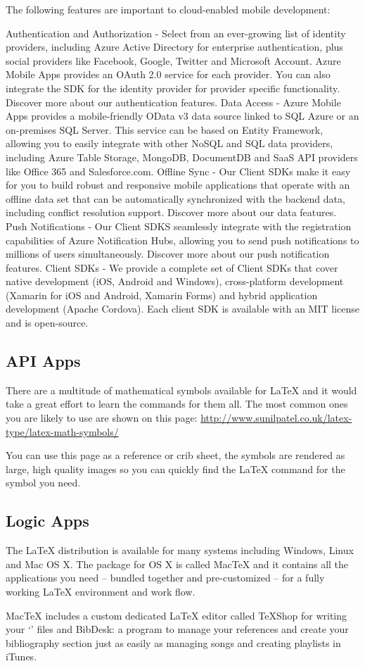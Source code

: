 The following features are important to cloud-enabled mobile development:

Authentication and Authorization - Select from an ever-growing list of identity providers, including Azure Active Directory for enterprise authentication, plus social providers like Facebook, Google, Twitter and Microsoft Account. Azure Mobile Apps provides an OAuth 2.0 service for each provider. You can also integrate the SDK for the identity provider for provider specific functionality.
Discover more about our authentication features.
Data Access - Azure Mobile Apps provides a mobile-friendly OData v3 data source linked to SQL Azure or an on-premises SQL Server. This service can be based on Entity Framework, allowing you to easily integrate with other NoSQL and SQL data providers, including Azure Table Storage, MongoDB, DocumentDB and SaaS API providers like Office 365 and Salesforce.com.
Offline Sync - Our Client SDKs make it easy for you to build robust and responsive mobile applications that operate with an offline data set that can be automatically synchronized with the backend data, including conflict resolution support.
Discover more about our data features.
Push Notifications - Our Client SDKS seamlessly integrate with the registration capabilities of Azure Notification Hubs, allowing you to send push notifications to millions of users simultaneously.
Discover more about our push notification features.
Client SDKs - We provide a complete set of Client SDKs that cover native development (iOS, Android and Windows), cross-platform development (Xamarin for iOS and Android, Xamarin Forms) and hybrid application development (Apache Cordova). Each client SDK is available with an MIT license and is open-source.




\subsection{API Apps }
There are a multitude of mathematical symbols available for \LaTeX{} and it would take a great effort to learn the commands for them all. The most common ones you are likely to use are shown on this page:
\url{http://www.sunilpatel.co.uk/latex-type/latex-math-symbols/}

You can use this page as a reference or crib sheet, the symbols are rendered as large, high quality images so you can quickly find the \LaTeX{} command for the symbol you need.

\subsection{Logic Apps  }

The \LaTeX{} distribution is available for many systems including Windows, Linux and Mac OS X. The package for OS X is called MacTeX and it contains all the applications you need -- bundled together and pre-customized -- for a fully working \LaTeX{} environment and work flow.

MacTeX includes a custom dedicated \LaTeX{} editor called TeXShop for writing your `' files and BibDesk: a program to manage your references and create your bibliography section just as easily as managing songs and creating playlists in iTunes.
